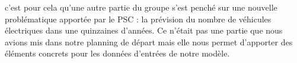 	c'est pour cela qu'une autre partie du groupe s'est penché sur une nouvelle problématique apportée par le PSC : la prévision du nombre de véhicules électriques dans une quinzaines d'années. Ce n'était pas une partie que nous avions mis dans notre planning de départ mais elle nous permet d'apporter des éléments concrets pour les données d'entrées de notre modèle.
	